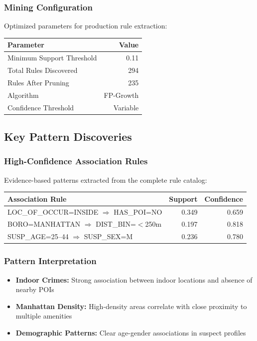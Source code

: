 \documentclass[11pt]{article}
\begin{document}
\subsubsection{Mining Configuration}
Optimized parameters for production rule extraction:
\begin{center}
\begin{tabular}{l r}
\toprule
\textbf{Parameter} & \textbf{Value} \\
\midrule
Minimum Support Threshold & 0.11 \\
Total Rules Discovered & 294 \\
Rules After Pruning & 235 \\
Algorithm & FP-Growth \\
Confidence Threshold & Variable \\
\bottomrule
\end{tabular}
\end{center}

\subsection{Key Pattern Discoveries}

\subsubsection{High-Confidence Association Rules}
Evidence-based patterns extracted from the complete rule catalog:

\begin{center}
\begin{tabular}{p{10cm} r r}
\toprule
\textbf{Association Rule} & \textbf{Support} & \textbf{Confidence} \\
\midrule
LOC\_OF\_OCCUR=INSIDE $\Rightarrow$ HAS\_POI=NO & 0.349 & 0.659 \\
BORO=MANHATTAN $\Rightarrow$ DIST\_BIN=$<$250m & 0.197 & 0.818 \\
SUSP\_AGE=25--44 $\Rightarrow$ SUSP\_SEX=M & 0.236 & 0.780 \\
\bottomrule
\end{tabular}
\end{center}

\subsubsection{Pattern Interpretation}
\begin{itemize}[leftmargin=*]
\item \textbf{Indoor Crimes:} Strong association between indoor locations and absence of nearby POIs
\item \textbf{Manhattan Density:} High-density areas correlate with close proximity to multiple amenities
\item \textbf{Demographic Patterns:} Clear age-gender associations in suspect profiles
\end{itemize}
\end{document}
